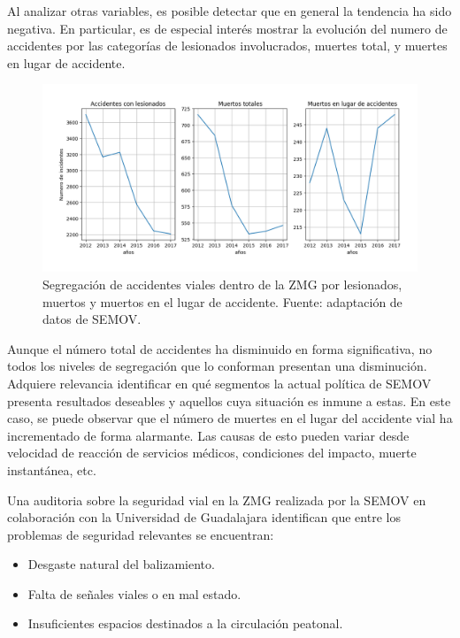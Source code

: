 \documentclass{article}
\begin{document}
Al analizar otras variables, es posible detectar que en general la tendencia ha sido negativa.
En particular, es de especial interés mostrar la evolución del numero de accidentes por las
categorías de lesionados involucrados, muertes total, y muertes en lugar de accidente.

	\begin{figure}[H]\centering
	\includegraphics[width=1\textwidth]{resources/img/accidentes_general_segregacion_img.png}
	\caption{\label{fig:accidentes_general_segregacion_img} Segregación de accidentes viales dentro de la ZMG por lesionados, muertos y muertos en el lugar de accidente. Fuente: adaptación de datos de SEMOV.}
    \end{figure}

Aunque el número total de accidentes ha disminuido en forma significativa,
no todos los niveles de segregación que lo conforman presentan una disminución.
Adquiere relevancia identificar en qué segmentos la actual política de SEMOV presenta
resultados deseables y aquellos cuya situación es inmune a estas.
En este caso, se puede observar que el número de muertes en el lugar del accidente
vial ha incrementado de forma alarmante. Las causas de esto pueden variar desde
velocidad de reacción de servicios médicos, condiciones del impacto, muerte instantánea,
etc.

Una auditoria sobre la seguridad vial en la ZMG realizada por la SEMOV en colaboración con la Universidad de Guadalajara
identifican que entre los problemas de seguridad relevantes se encuentran:

	\begin{itemize}
		\item Desgaste natural del balizamiento.
		\item Falta de señales viales o en mal estado.
		\item Insuficientes espacios destinados a la circulación peatonal.
	\end{itemize}
\end{document}
